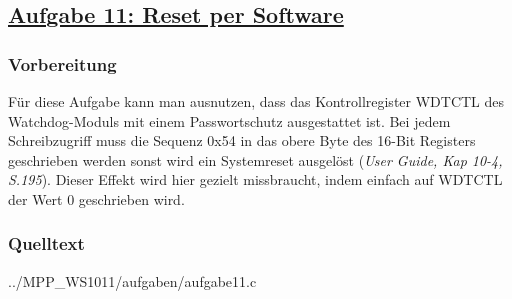 \subsection
{\href{http://cst.mi.fu-berlin.de/intern/19606-P-MPP/Aufgaben/040303.html}
{Aufgabe 11: Reset per Software}}

\subsubsection*{Vorbereitung}

Für diese Aufgabe kann man ausnutzen, dass das Kontrollregister WDTCTL
des Watchdog-Moduls mit einem Passwortschutz ausgestattet ist. Bei jedem
Schreibzugriff muss die Sequenz 0x54 in das obere Byte des 16-Bit
Registers geschrieben werden sonst wird ein Systemreset ausgelöst
({\it User Guide, Kap 10-4, S.195}). Dieser Effekt wird hier gezielt missbraucht,
indem einfach auf WDTCTL der Wert 0 geschrieben wird.

\subsubsection*{Quelltext}


{../MPP_WS1011/aufgaben/aufgabe11.c}
